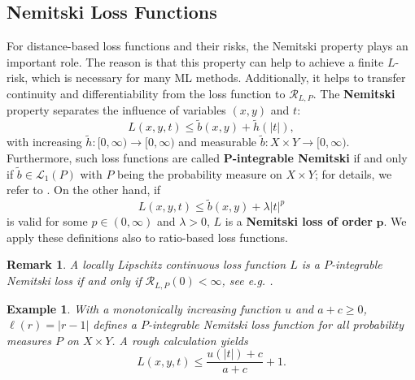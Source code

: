 \documentclass[10pt]{article}
\newcommand{\XY}{X \times Y}
\newcommand{\Lcal}{\mathcal{L}}
\newcommand{\RLP}{\mathcal{R}_{L,P}}
\newtheorem{remark}[theorem]{Remark}
\newtheorem{example}[theorem]{Example}
\begin{document}
\subsection{Nemitski Loss Functions}
For distance-based loss functions and their risks, the Nemitski property plays an important role. The reason is that this property can help to achieve a finite $L$-risk, which is necessary for many ML methods.
Additionally, it helps to transfer continuity and differentiability from the loss function to $\RLP$.
The \textbf{Nemitski} property separates the influence of variables $(x, y)$ and $t$:
\begin{equation*}
	L(x, y,t) \leq \tilde{b}(x, y) + \tilde{h}(|t|),
\end{equation*}
with increasing $\tilde{h}: [0, \infty) \to [0, \infty)$ and measurable $\tilde{b}: \XY \to [0, \infty)$.
Furthermore, such loss functions are called $\boldsymbol{P}$\textbf{-integrable Nemitski} if and only if $\tilde{b} \in \Lcal_1(P)$ with $P$ being the probability measure on $X \times Y$; for details, we refer to \cite[Section 2.4]{SC08}. 
On the other hand, if
\begin{equation*}
	L(x,y,t) \leq \tilde{b}(x,y) + \lambda |t|^p
\end{equation*}
is valid for some $p \in (0, \infty)$ and $\lambda > 0$, $L$ is a \textbf{Nemitski loss of order} $\boldsymbol{p}$.
We apply these definitions also to ratio-based loss functions.
\begin{remark}
	A locally Lipschitz continuous loss function $L$ is a $P$-integrable Nemitski loss if and only if $\mathcal{R}_{L,P}(0) < \infty$, see e.g. \cite[p. 31]{SC08}.
\end{remark}
\begin{example}
	With a monotonically increasing function $u$ and $a + c \geq 0$, $\ell(r) = |r-1|$ defines a $P$-integrable Nemitski loss function for all probability measures $P$ on $\XY$.
	A rough calculation yields
	\begin{equation*}
		L(x,y,t) \leq \frac{u(|t|)+c}{a+c} + 1.
	\end{equation*}
\end{example}
\end{document}
